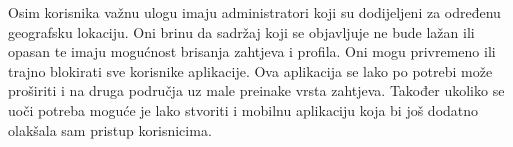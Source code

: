 Osim korisnika važnu ulogu imaju administratori koji su dodijeljeni za određenu geografsku lokaciju. Oni brinu da sadržaj koji se objavljuje ne bude lažan ili opasan te imaju mogućnost brisanja zahtjeva i profila. Oni mogu privremeno ili trajno blokirati sve korisnike aplikacije.
\newline
Ova aplikacija se lako po potrebi može proširiti i na druga područja uz male preinake vrsta zahtjeva. Također ukoliko se uoči potreba moguće je lako stvoriti i mobilnu aplikaciju koja bi još dodatno olakšala sam pristup korisnicima.

\eject
		
	